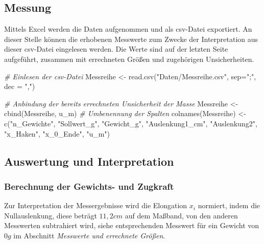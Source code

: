 \documentclass[class=article, crop=false]{standalone}
\newenvironment{Shaded}{\begin{snugshade}}{\end{snugshade}}
\newcommand{\AttributeTok}[1]{\textcolor[rgb]{0.77,0.63,0.00}{#1}}
\newcommand{\CommentTok}[1]{\textcolor[rgb]{0.56,0.35,0.01}{\textit{#1}}}
\newcommand{\FunctionTok}[1]{\textcolor[rgb]{0.00,0.00,0.00}{#1}}
\newcommand{\NormalTok}[1]{#1}
\newcommand{\OtherTok}[1]{\textcolor[rgb]{0.56,0.35,0.01}{#1}}
\newcommand{\StringTok}[1]{\textcolor[rgb]{0.31,0.60,0.02}{#1}}
\begin{document}
\hypertarget{messung}{%
\subsection{Messung}\label{messung}}

Mittels Excel werden die Daten aufgenommen und als csv-Datei exportiert.
An dieser Stelle können die erhobenen Messwerte zum Zwecke der
Interpretation aus dieser csv-Datei eingelesen werden. Die Werte sind
auf der letzten Seite aufgeführt, zusammen mit errechneten Größen und
zugehörigen Unsicherheiten.

\begin{Shaded}
\begin{Highlighting}[]
\CommentTok{\# Einlesen der csv{-}Datei}
\NormalTok{Messreihe }\OtherTok{\textless{}{-}} \FunctionTok{read.csv}\NormalTok{(}\StringTok{"Daten/Messreihe.csv"}\NormalTok{, }\AttributeTok{sep=}\StringTok{";"}\NormalTok{, }\AttributeTok{dec =} \StringTok{","}\NormalTok{)}

\CommentTok{\# Anbindung der bereits errechneten Unsicherheit der Masse}
\NormalTok{Messreihe }\OtherTok{\textless{}{-}} \FunctionTok{cbind}\NormalTok{(Messreihe, u\_m)}
\CommentTok{\# Umbenennung der Spalten}
\FunctionTok{colnames}\NormalTok{(Messreihe) }\OtherTok{\textless{}{-}} \FunctionTok{c}\NormalTok{(}\StringTok{"n\_Gewichte"}\NormalTok{, }\StringTok{"Sollwert\_g"}\NormalTok{, }\StringTok{"Gewicht\_g"}\NormalTok{, }
                         \StringTok{"Auslenkung1\_cm"}\NormalTok{,  }\StringTok{"Auslenkung2"}\NormalTok{, }\StringTok{"x\_Haken"}\NormalTok{, }
                         \StringTok{"x\_0\_Ende"}\NormalTok{, }\StringTok{"u\_m"}\NormalTok{)}
\end{Highlighting}
\end{Shaded}

\hypertarget{auswertung-und-interpretation}{%
\subsection{Auswertung und
Interpretation}\label{auswertung-und-interpretation}}

\hypertarget{berechnung-der-gewichts--und-zugkraft}{%
\subsubsection{Berechnung der Gewichts- und
Zugkraft}\label{berechnung-der-gewichts--und-zugkraft}}

Zur Interpretation der Messergebnisse wird die Elongation \(x_i\)
normiert, indem die Nullauslenkung, diese beträgt \(11,2 cm\) auf dem
Maßband, von den anderen Messwerten subtrahiert wird, siehe
entsprechenden Messwert für ein Gewicht von \(0g\) im Abschnitt
\textit{Messwerte und errechnete Größen}.
\end{document}

